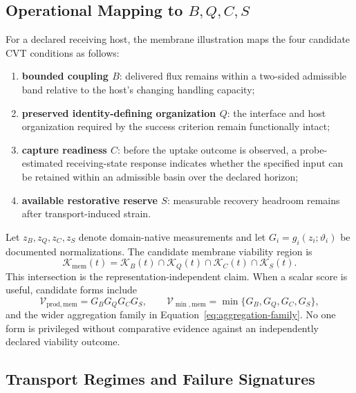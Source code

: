 \documentclass[11pt]{article}
\newcommand{\V}{\mathcal{V}}
\begin{document}
\subsection{Operational Mapping to \(B,Q,C,S\)}

For a declared receiving host, the membrane illustration maps the four candidate CVT conditions as follows:
\begin{enumerate}[label=(\roman*)]
    \item \textbf{bounded coupling \(B\)}: delivered flux remains within a two-sided admissible band relative to the host's changing handling capacity;
    \item \textbf{preserved identity-defining organization \(Q\)}: the interface and host organization required by the success criterion remain functionally intact;
    \item \textbf{capture readiness \(C\)}: before the uptake outcome is observed, a probe-estimated receiving-state response indicates whether the specified input can be retained within an admissible basin over the declared horizon;
    \item \textbf{available restorative reserve \(S\)}: measurable recovery headroom remains after transport-induced strain.
\end{enumerate}

Let \(z_B,z_Q,z_C,z_S\) denote domain-native measurements and let \(G_i=g_i(z_i;\vartheta_i)\) be documented normalizations. The candidate membrane viability region is
\begin{equation}
    \mathcal K_{\mathrm{mem}}(t)
    =
    \mathcal K_B(t)
    \cap
    \mathcal K_Q(t)
    \cap
    \mathcal K_C(t)
    \cap
    \mathcal K_S(t).
    \label{eq:membrane-viability-region}
\end{equation}
This intersection is the representation-independent claim. When a scalar score is useful, candidate forms include
\begin{equation}
    \V_{\mathrm{prod,mem}}
    =
    G_BG_QG_CG_S,
    \qquad
    \V_{\min,\mathrm{mem}}
    =
    \min\{G_B,G_Q,G_C,G_S\},
    \label{eq:membrane-candidate-scores}
\end{equation}
and the wider aggregation family in Equation~\eqref{eq:aggregation-family}. No one form is privileged without comparative evidence against an independently declared viability outcome.

\subsection{Transport Regimes and Failure Signatures}
\end{document}
